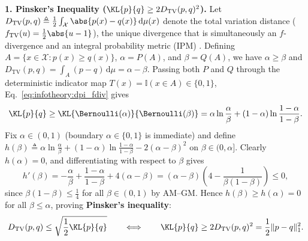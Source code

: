 \documentclass[../../../../master.tex]{subfiles}
\begin{document}
\begin{coremath}
\label{cm:infotheory:pinsker_fenchel}
\textbf{1. Pinsker's Inequality ($\KL{p}{q} \ge 2 D_{\mathrm{TV}}(p, q)^2$).} Let $D_{\mathrm{TV}}(p, q) \triangleq \frac{1}{2}\int_{\mathcal{X}} \abs{p(x) - q(x)}\,\mathrm{d}\mu(x)$ denote the total variation distance ($f_{\mathrm{TV}}(u) = \frac{1}{2}\abs{u-1}$), the unique divergence that is simultaneously an $f$-divergence and an integral probability metric (IPM) . Defining $A = \{x \in \mathcal{X} : p(x) \ge q(x)\}$, $\alpha = P(A)$, and $\beta = Q(A)$, we have $\alpha \ge \beta$ and $D_{\mathrm{TV}}(p, q) = \int_A (p - q)\,\mathrm{d}\mu = \alpha - \beta$. Passing both $P$ and $Q$ through the deterministic indicator map $T(x) = \mathbb{I}(x \in A) \in \{0, 1\}$, Eq.~\eqref{eq:infotheory:dpi_fdiv} gives
\begin{equation}
\label{eq:infotheory:pinsker_reduce}
  \KL{p}{q} \ge \KL{\Bernoulli(\alpha)}{\Bernoulli(\beta)}
  = \alpha \ln\frac{\alpha}{\beta} + (1 - \alpha)\ln\frac{1 - \alpha}{1 - \beta}.
\end{equation}
Fix $\alpha \in (0, 1)$ (boundary $\alpha\in\{0,1\}$ is immediate) and define $h(\beta) \triangleq \alpha\ln\frac{\alpha}{\beta} + (1-\alpha)\ln\frac{1-\alpha}{1-\beta} - 2(\alpha-\beta)^2$ on $\beta \in (0, \alpha]$. Clearly $h(\alpha) = 0$, and differentiating with respect to $\beta$ gives
\begin{equation}
\label{eq:infotheory:pinsker_deriv}
  h'(\beta)
  = -\frac{\alpha}{\beta} + \frac{1-\alpha}{1-\beta} + 4(\alpha - \beta)
  = (\alpha - \beta)\left(4 - \frac{1}{\beta(1 - \beta)}\right) \le 0,
\end{equation}
since $\beta(1-\beta) \le \frac{1}{4}$ for all $\beta \in (0, 1)$ by AM--GM. Hence $h(\beta) \ge h(\alpha) = 0$ for all $\beta \le \alpha$, proving \textbf{Pinsker's inequality}:
\begin{equation}
\label{eq:infotheory:pinsker}
  D_{\mathrm{TV}}(p, q) \le \sqrt{\frac{1}{2}\KL{p}{q}}
  \qquad\Longleftrightarrow\qquad
  \KL{p}{q} \ge 2 D_{\mathrm{TV}}(p, q)^2 = \frac{1}{2}\|p - q\|_1^2.
\end{equation}


\end{coremath}
\end{document}
